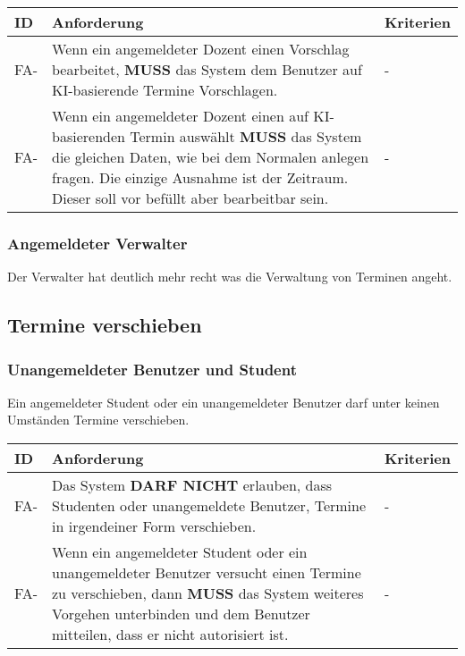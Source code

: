 \vspace{12pt}

\begin{tabular} {|p{}|p{11cm}|p{}|}
	\hline
	ID & Anforderung & Kriterien \\
	\hline
	FA-
	& Wenn ein angemeldeter Dozent einen Vorschlag bearbeitet, \textbf{MUSS} das System dem Benutzer auf KI-basierende Termine Vorschlagen. 
	& - \\
	\hline
	FA-
	& Wenn ein angemeldeter Dozent einen auf KI-basierenden Termin auswählt \textbf{MUSS} das System die gleichen Daten, wie bei dem Normalen anlegen fragen. Die einzige Ausnahme ist der Zeitraum. Dieser soll vor befüllt aber bearbeitbar sein. 
	& - \\
	\hline
\end{tabular}


\newpage

\subsubsection{Angemeldeter Verwalter}
Der Verwalter hat deutlich mehr recht was die Verwaltung von Terminen angeht. 

\newpage

\subsection{Termine verschieben}

\subsubsection{Unangemeldeter Benutzer und Student}
Ein angemeldeter Student oder ein unangemeldeter Benutzer darf unter keinen Umständen Termine verschieben.

\vspace{12pt}

\begin{tabular} {|p{}|p{11cm}|p{}|}
	\hline
	ID & Anforderung & Kriterien \\
	\hline
	FA-
	& Das System \textbf{DARF NICHT} erlauben, dass Studenten oder unangemeldete Benutzer, Termine in irgendeiner Form verschieben. 
	& - \\
	\hline
	FA-
	& Wenn ein angemeldeter Student oder ein unangemeldeter Benutzer versucht einen Termine zu verschieben, dann \textbf{MUSS} das System weiteres Vorgehen unterbinden und dem Benutzer mitteilen, dass er nicht autorisiert ist.
	& - \\ 
	\hline
\end{tabular}

